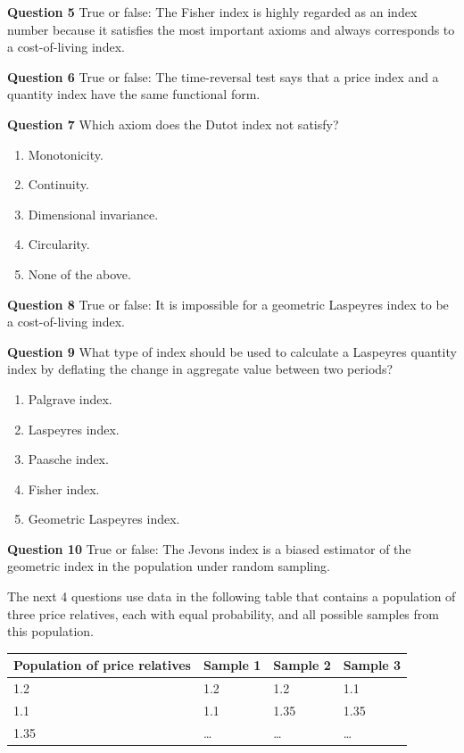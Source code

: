 \documentclass[]{article}
\begin{document}
\textbf{Question 5} True or false: The Fisher index is highly regarded as an index number because it satisfies the most important axioms and always corresponds to a cost-of-living index.

\textbf{Question 6} True or false: The time-reversal test says that a price index and a quantity index have the same functional form.

\textbf{Question 7} Which axiom does the Dutot index not satisfy?

\begin{enumerate}
\def\labelenumi{\alph{enumi})}
\item
  Monotonicity.
\item
  Continuity.
\item
  Dimensional invariance.
\item
  Circularity.
\item
  None of the above.
\end{enumerate}

\textbf{Question 8} True or false: It is impossible for a geometric Laspeyres index to be a cost-of-living index.

\textbf{Question 9} What type of index should be used to calculate a Laspeyres quantity index by deflating the change in aggregate value between two periods?

\begin{enumerate}
\def\labelenumi{\alph{enumi})}
\item
  Palgrave index.
\item
  Laspeyres index.
\item
  Paasche index.
\item
  Fisher index.
\item
  Geometric Laspeyres index.
\end{enumerate}

\textbf{Question 10} True or false: The Jevons index is a biased estimator of the geometric index in the population under random sampling.

The next 4 questions use data in the following table that contains a population of three price relatives, each with equal probability, and all possible samples from this population.

\begin{longtable}[]{@{}llll@{}}
\toprule
Population of price relatives & Sample 1 & Sample 2 & Sample 3\tabularnewline
\midrule
\endhead
1.2 & 1.2 & 1.2 & 1.1\tabularnewline
1.1 & 1.1 & 1.35 & 1.35\tabularnewline
1.35 & \ldots{} & \ldots{} & \ldots{}\tabularnewline
\bottomrule
\end{longtable}
\end{document}
